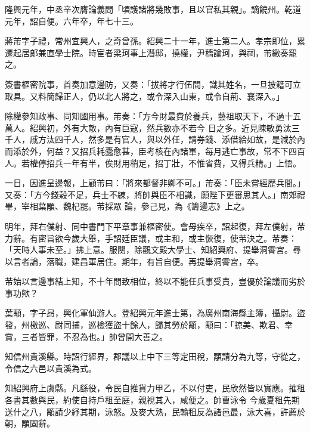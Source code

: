 \begin{pinyinscope}
 隆興元年，中丞辛次膺論義問「頃護諸將幾敗事，且以官私其親」。謫饒州。乾道元年，詔自便。六年卒，年七十三。



 蔣芾字子禮，常州宜興人，之奇曾孫。紹興二十一年，進士第二人。孝宗即位，累遷起居郎兼直學士院。時宦者梁珂事上潛邸，撓權，尹穡論珂，與祠，芾繳奏罷之。



 簽書樞密院事，首奏加意邊防，又奏：「拔將才行伍間，識其姓名，一旦披籍可立取具。又料簡歸正人，仍以北人將之，或令深入山東，或令自荊、襄深入。」



 除權參知政事、同知國用事。芾奏：「方今財最費於養兵，藝祖取天下，不過十五萬人。紹興初，外有大敵，內有巨寇，然兵數亦不若今
 日之多。近見陳敏勇汰三千人，戚方汰四千人，然多是有官人，與以外任，請券錢、添借給如故，是減於內而添於外，何益？又招兵耗蠹愈甚，臣考核在內諸軍，每月逃亡事故，常不下四百人。若權停招兵一年有半，俟財用稍足，招丁壯，不惟省費，又得兵精。」上悟。



 一日，因進呈邊報，上顧芾曰：「將來都督非卿不可。」芾奏：「臣未嘗經歷兵間。」又奏：「方今錢穀不足，兵士不練，將帥與臣不相識，願陛下更審思其人。」南郊禮畢，宰相葉顒、魏杞罷。芾採眾
 論，參己見，為《籌邊志》上之。



 明年，拜右僕射、同中書門下平章事兼樞密使。會母疾卒，詔起復，拜左僕射，芾力辭。有密旨欲今歲大舉，手詔廷臣議，或主和，或主恢復，使芾決之。芾奏：「天時人事未至。」拂上意。服闋，除觀文殿大學士、知紹興府、提舉洞霄宮。尋以言者論，落職，建昌軍居住。期年，有旨自便。再提舉洞霄宮，卒。



 芾始以言邊事結上知，不十年間致相位，終以不能任兵事受責，豈優於論議而劣於事功歟？



 葉顒，字子昂，興化軍仙游人。登紹興元年進士第，為廣州南海縣主簿，攝尉。盜發，州檄巡、尉同捕，巡檢獲盜十餘人，歸其勞於顒，顒曰：「掠美、欺君、幸賞，三者皆罪，不忍為也。」帥曾開大善之。



 知信州貴溪縣。時詔行經界，郡議以上中下三等定田稅，顒請分為九等，守從之，令信之六邑以貴溪為式。



 知紹興府上虞縣。凡繇役，令民自推貨力甲乙，不以付吏，民欣然皆以實應。摧租各書其數與民，約使自持戶租至庭，親視其入，咸便之。帥曹泳令
 今歲夏租先期送什之八，顒請少紓其期，泳怒。及麥大熟，民輸租反為諸邑最，泳大喜，許薦於朝，顒固辭。




\end{pinyinscope}
